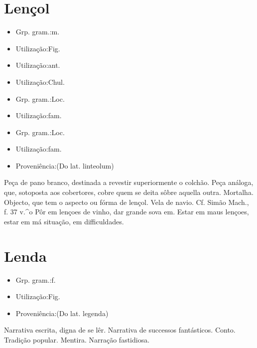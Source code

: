 \section{Lençol}
\begin{itemize}
\item {Grp. gram.:m.}
\end{itemize}
\begin{itemize}
\item {Utilização:Fig.}
\end{itemize}
\begin{itemize}
\item {Utilização:ant.}
\end{itemize}
\begin{itemize}
\item {Utilização:Chul.}
\end{itemize}
\begin{itemize}
\item {Grp. gram.:Loc.}
\end{itemize}
\begin{itemize}
\item {Utilização:fam.}
\end{itemize}
\begin{itemize}
\item {Grp. gram.:Loc.}
\end{itemize}
\begin{itemize}
\item {Utilização:fam.}
\end{itemize}
\begin{itemize}
\item {Proveniência:(Do lat. \textunderscore linteolum\textunderscore )}
\end{itemize}
Peça de pano branco, destinada a revestir superiormente o colchão.
Peça análoga, que, sotoposta aos cobertores, cobre quem se deita sôbre aquella outra.
Mortalha.
Objecto, que tem o aspecto ou fórma de lençol.
Vela de navio. Cf. Simão Mach., f. 37 v.^o
\textunderscore Pôr em lençoes de vinho\textunderscore , dar grande sova em.
\textunderscore Estar em maus lençoes\textunderscore , estar em má situação, em difficuldades.
\section{Lenda}
\begin{itemize}
\item {Grp. gram.:f.}
\end{itemize}
\begin{itemize}
\item {Utilização:Fig.}
\end{itemize}
\begin{itemize}
\item {Proveniência:(Do lat. \textunderscore legenda\textunderscore )}
\end{itemize}
Narrativa escrita, digna de se lêr.
Narrativa de successos fantásticos.
Conto.
Tradição popular.
Mentira.
Narração fastidiosa.
